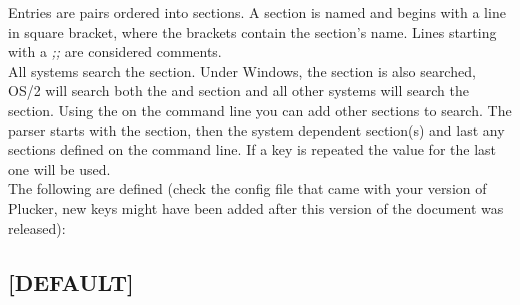 Entries are  pairs ordered into sections. A section
is named and begins with a line in square bracket, where the brackets
contain the section's name. Lines starting with a \emph{;;} are considered
comments.\\

All systems search the  section.
Under Windows, the  section
is also searched, OS/2 will search both the 
and  section and all other systems
will search the \option{[POSIX]} section. Using the 
on the command line you can add other sections to search. The parser starts
with the \option{[DEFAULT]} section, then the system dependent section(s)
and last any sections defined on the command line. If a key is repeated
the value for the last one will be used.\\

The following  are defined (check the config file that came with
your version of Plucker, new keys might have been added after this version
of the document was released):

\subsection{[DEFAULT]}

